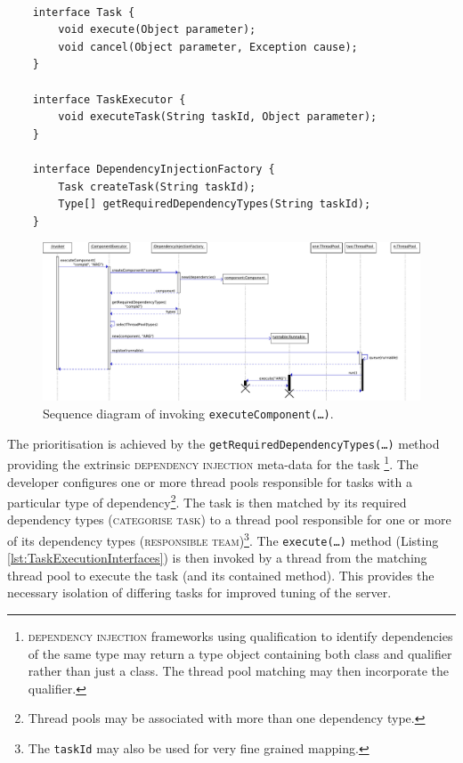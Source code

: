 \documentclass[prodmode]{style/acmlarge}
\begin{document}
\begin{lstlisting}[float,label=lst:TaskExecutionInterfaces]

    interface Task {
        void execute(Object parameter); 
        void cancel(Object parameter, Exception cause);
    }

    interface TaskExecutor {
        void executeTask(String taskId, Object parameter);
    }

    interface DependencyInjectionFactory {
        Task createTask(String taskId);
        Type[] getRequiredDependencyTypes(String taskId);
    }
\end{lstlisting}


\begin{figure}[!t]
\centering
\includegraphics[width=6in]{ExecuteComponentSequenceDiagram}
\caption{Sequence diagram of invoking \texttt{executeComponent(\ldots)}.}
\label{fig:ExecuteComponentSequenceDiagram}
\end{figure}

The prioritisation is achieved by the
\texttt{getRequiredDependencyTypes(\ldots)} method providing the extrinsic
\textsc{dependency injection} \cite{ioc} meta-data for the task
\footnote{\textsc{dependency injection} frameworks using qualification to
identify dependencies of the same type may return a type object containing both
class and qualifier rather than just a class.  The thread pool matching may then
incorporate the qualifier.}.  The developer configures one or more thread pools
responsible for tasks with a particular type of dependency\footnote{Thread pools
may be associated with more than one dependency type.}.  The task is then
matched by its required dependency types (\textsc{categorise task}) to a thread
pool responsible for one or more of its dependency types (\textsc{responsible
team})\footnote{The \texttt{taskId} may also be used for very fine grained
mapping.}.  The \texttt{execute(\ldots)} method (Listing
\ref{lst:TaskExecutionInterfaces}) is then invoked by a thread from the
matching thread pool to execute the task (and its contained method). This
provides the necessary isolation of differing tasks for improved tuning of the
server.
\end{document}
